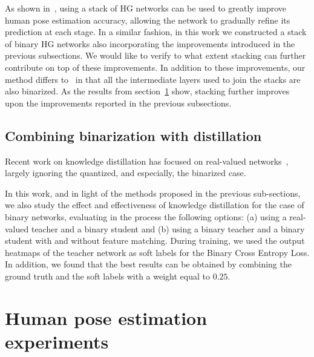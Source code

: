 \documentclass[10pt,twocolumn,letterpaper]{article}
\begin{document}
As shown in~\cite{newell2016stacked}, using a stack of HG networks can be used to greatly improve human pose estimation accuracy, allowing the network to gradually refine its prediction at each stage. In a similar fashion, in this work we constructed a stack of binary HG networks also incorporating the improvements introduced in the previous subsections. We would like to verify to what extent stacking can further contribute on top of these improvements. In addition to these improvements, our method differs to~\cite{bulat2018hierarchical} in that all the intermediate layers used to join the stacks are also binarized. As the results from section~\ref{sec:results-human-pose} show, stacking further improves upon the improvements reported in the previous subsections.


















\subsection{Combining binarization with distillation}\label{sec:distilled-binary-nets}

Recent work on knowledge distillation has focused on real-valued networks~\cite{hinton2015distilling}, largely ignoring the quantized, and especially, the binarized case. 

In this work, and in light of the methods proposed in the previous sub-sections, we also study the effect and effectiveness of knowledge distillation for the case of binary networks, evaluating in the process the following options: (a) using a real-valued teacher and a binary student and (b) using a binary teacher and a binary student with and without feature matching. During training, we used the output heatmaps of the teacher network as soft labels for the Binary Cross Entropy Loss. In addition, we found that the best results can be obtained by combining the ground truth and the soft labels with a weight equal to $0.25$. 





\section{Human pose estimation experiments}\label{sec:results-human-pose}
\end{document}
